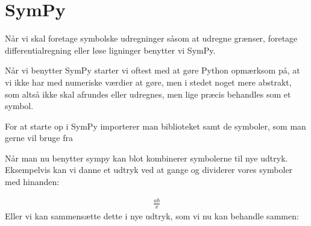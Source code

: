 \documentclass[letterpaper,10pt,english]{jupyterBook}
\begin{document}
\section{SymPy}
\label{\detokenize{notebooks/Intro_til_pakker:sympy}}
Når vi skal foretage symbolske udregninger såsom at udregne grænser, foretage differentialregning eller løse ligninger benytter vi SymPy.

Når vi benytter SymPy starter vi oftest med at gøre Python opmærksom på, at vi ikke har med numeriske værdier at gøre, men i stedet noget mere abstrakt, som altså ikke skal afrundes eller udregnes, men lige præcis behandles som et symbol.

For at starte op i SymPy importerer man biblioteket samt de symboler, som man gerne vil bruge fra 

\begin{sphinxVerbatim}[commandchars=\\\{\}]
                      
         
\end{sphinxVerbatim}

Når man nu benytter sympy kan blot kombinerer symbolerne til nye udtryk.
Eksempelvis kan vi danne et udtryk  ved at gange og dividerer vores symboler med hinanden:

\begin{sphinxVerbatim}[commandchars=\\\{\}]
     
\end{sphinxVerbatim}
\begin{equation*}
\begin{split}\displaystyle \frac{a b}{x}\end{split}
\end{equation*}
Eller vi kan sammensætte dette i nye udtryk, som vi nu kan behandle sammen:
\end{document}
